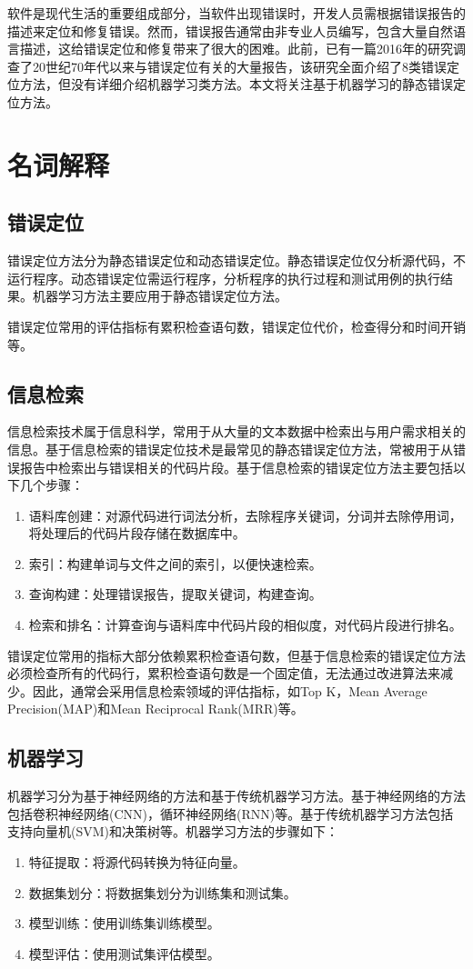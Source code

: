 软件是现代生活的重要组成部分，当软件出现错误时，开发人员需根据错误报告的描述来定位和修复错误。然而，错误报告通常由非专业人员编写，包含大量自然语言描述，这给错误定位和修复带来了很大的困难。此前，已有一篇2016年的研究调查了20世纪70年代以来与错误定位有关的大量报告\cite{7390282}，该研究全面介绍了8类错误定位方法，但没有详细介绍机器学习类方法。本文将关注基于机器学习的静态错误定位方法。
\section{名词解释}
\subsection{错误定位}
错误定位方法分为静态错误定位和动态错误定位。静态错误定位仅分析源代码，不运行程序。动态错误定位需运行程序，分析程序的执行过程和测试用例的执行结果。机器学习方法主要应用于静态错误定位方法。

错误定位常用的评估指标有累积检查语句数，错误定位代价，检查得分和时间开销等。
\subsection{信息检索}
信息检索技术属于信息科学，常用于从大量的文本数据中检索出与用户需求相关的信息。基于信息检索的错误定位技术是最常见的静态错误定位方法，常被用于从错误报告中检索出与错误相关的代码片段。基于信息检索的错误定位方法主要包括以下几个步骤：
\begin{enumerate}
    \item 语料库创建：对源代码进行词法分析，去除程序关键词，分词并去除停用词，将处理后的代码片段存储在数据库中。
    \item 索引：构建单词与文件之间的索引，以便快速检索。
    \item 查询构建：处理错误报告，提取关键词，构建查询。
    \item 检索和排名：计算查询与语料库中代码片段的相似度，对代码片段进行排名。
\end{enumerate}

错误定位常用的指标大部分依赖累积检查语句数，但基于信息检索的错误定位方法必须检查所有的代码行，累积检查语句数是一个固定值，无法通过改进算法来减少。因此，通常会采用信息检索领域的评估指标，如Top K，Mean Average Precision(MAP)和Mean Reciprocal Rank(MRR)等。
\subsection{机器学习}
机器学习分为基于神经网络的方法和基于传统机器学习方法。基于神经网络的方法包括卷积神经网络(CNN)，循环神经网络(RNN)等。基于传统机器学习方法包括支持向量机(SVM)和决策树等。机器学习方法的步骤如下：
\begin{enumerate}
    \item 特征提取：将源代码转换为特征向量。
    \item 数据集划分：将数据集划分为训练集和测试集。
    \item 模型训练：使用训练集训练模型。
    \item 模型评估：使用测试集评估模型。
\end{enumerate}

